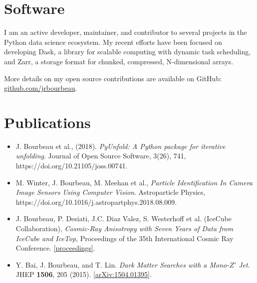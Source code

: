 \documentclass[line,margin]{res}
\begin{document}
\begin{resume}
\section{\sc Software}

	I am an active developer, maintainer, and contributor to several projects in the Python data science ecosystem.
	My recent efforts have been focused on developing Dask, a library for scalable computing with
	dynamic task scheduling, and Zarr, a storage format for chunked, compressed, N-dimensional arrays.

	More details on my open source contributions are available on GitHub:
	\href{https://github.com/jrbourbeau}{github.com/jrbourbeau}.

\section{\sc Publications}
\begin{itemize}

	\item J. Bourbeau et al., (2018). {\it PyUnfold: A Python package for iterative unfolding}.
		Journal of Open Source Software, 3(26), 741, https://doi.org/10.21105/joss.00741.

	\item M. Winter, J. Bourbeau, M. Meehan et al., {\it Particle Identification In Camera Image Sensors Using Computer Vision}.
		Astroparticle Physics, \\
		https://doi.org/10.1016/j.astropartphys.2018.08.009.

	\item J. Bourbeau, P. Desiati, J.C. Diaz Valez, S. Westerhoff et al. (IceCube Collaboration),
		{\it Cosmic-Ray Anisotropy with Seven Years of Data from IceCube and IceTop},
		Proceedings of the 35th International Cosmic Ray Conference.
	\href{https://pos.sissa.it/301/474/pdf}{[proceedings]}.

	\item Y. Bai, J. Bourbeau, and T. Lin. {\it Dark Matter Searches with a Mono-$Z'$ Jet}. JHEP {\bf 1506}, 205 (2015).
	\href{http://arxiv.org/pdf/1504.01395.pdf}{[arXiv:1504.01395]}.

\end{itemize}




\iffalse

\end{resume}
\end{document}
